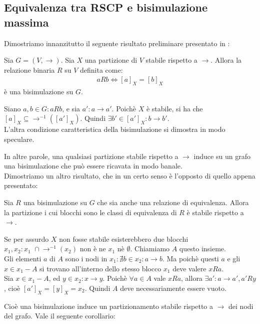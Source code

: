\subsection{Equivalenza tra RSCP e bisimulazione massima}
Dimostriamo innanzitutto il seguente risultato preliminare presentato in \cite{gentilini}:
\begin{proposition}
    Sia $G = (V,\to)$. Sia $X$ una partizione di $V$ stabile rispetto a $\to$. Allora la relazione binaria $R$ su $V$ definita come:
    \begin{gather*}
        a R b \iff [a]_X = [b]_X
    \end{gather*}
    è una bisimulazione su $G$.
    \label{prop:part_induce_bisi}
\end{proposition}
\begin{proof2}
    Siano $a,b \in G : a R b$, e sia $a' : a \to a'$. Poichè $X$ è stabile, si ha che $[a]_X \subseteq \to^{-1}([a']_X)$. Quindi $\exists b' \in [a']_X : b \to b'$.\\
    L'altra condizione caratteristica della bisimulazione si dimostra in modo speculare.
\end{proof2}
In altre parole, una qualsiasi partizione stabile rispetto a $\to$ induce su un grafo una bisimulazione che può essere ricavata in modo banale.\\
Dimostriamo un altro risultato, che in un certo senso è l'opposto di quello appena presentato:
\begin{proposition}
    Sia $R$ una bisimulazione su $G$ che sia anche una relazione di equivalenza. Allora la partizione i cui blocchi sono le classi di equivalenza di $R$ è stabile rispetto a $\to$.
    \label{prop:bisi_induce_part}
\end{proposition}
\begin{proof2}
    Se per assurdo $X$ non fosse stabile esisterebbero due blocchi $x_1, x_2 : x_1 \,\,\cap \to^{-1}(x_2)$ non è ne $x_1$ nè $\emptyset$. Chiamiamo $A$ questo insieme.\\
    Gli elementi $a$ di $A$ sono i nodi in $x_1 : \nexists b \in x_2 : a \to b$. Ma poichè questi $a$ e gli $x \in x_1 - A$ si trovano all'interno dello stesso blocco $x_1$ deve valere $x R a$.\\
    Sia $x \in x_1 - A$, ed $y \in x_2 : x \to y$. Poichè $\forall a \in A$ vale $x R a$, allora $\exists a' : a \to a', a' R y$, cioè $[a']_X = [y]_X = x_2$. Quindi $A$ deve necessariamente essere vuoto.
\end{proof2}
Cioè una bisimulazione induce un partizionamento stabile rispetto a $\to$ dei nodi del grafo. Vale il seguente corollario:
